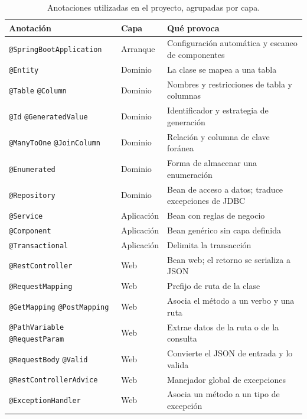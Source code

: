 \documentclass[11pt,a4paper,openany]{book}
\begin{document}
\begin{table}[htbp]
	\centering
	\caption{Anotaciones utilizadas en el proyecto, agrupadas por capa.}
	\label{tab:anotaciones}
	\scriptsize
	\begin{tabularx}{\textwidth}{L{3.5cm} L{2.1cm} X}
		\toprule
		\textbf{Anotación} & \textbf{Capa} & \textbf{Qué provoca} \\
		\midrule
		\texttt{@SpringBootApplication} & Arranque & Configuración automática y escaneo de componentes \\
		\texttt{@Entity} & Dominio & La clase se mapea a una tabla \\
		\texttt{@Table} \texttt{@Column} & Dominio & Nombres y restricciones de tabla y columnas \\
		\texttt{@Id} \texttt{@GeneratedValue} & Dominio & Identificador y estrategia de generación \\
		\texttt{@ManyToOne} \texttt{@JoinColumn} & Dominio & Relación y columna de clave foránea \\
		\texttt{@Enumerated} & Dominio & Forma de almacenar una enumeración \\
		\texttt{@Repository} & Dominio & Bean de acceso a datos; traduce excepciones de JDBC \\
		\texttt{@Service} & Aplicación & Bean con reglas de negocio \\
		\texttt{@Component} & Aplicación & Bean genérico sin capa definida \\
		\texttt{@Transactional} & Aplicación & Delimita la transacción \\
		\texttt{@RestController} & Web & Bean web; el retorno se serializa a JSON \\
		\texttt{@RequestMapping} & Web & Prefijo de ruta de la clase \\
		\texttt{@GetMapping} \texttt{@PostMapping} & Web & Asocia el método a un verbo y una ruta \\
		\texttt{@PathVariable} \texttt{@RequestParam} & Web & Extrae datos de la ruta o de la consulta \\
		\texttt{@RequestBody} \texttt{@Valid} & Web & Convierte el JSON de entrada y lo valida \\
		\texttt{@RestControllerAdvice} & Web & Manejador global de excepciones \\
		\texttt{@ExceptionHandler} & Web & Asocia un método a un tipo de excepción \\
		\bottomrule
	\end{tabularx}
\end{table}
\end{document}
